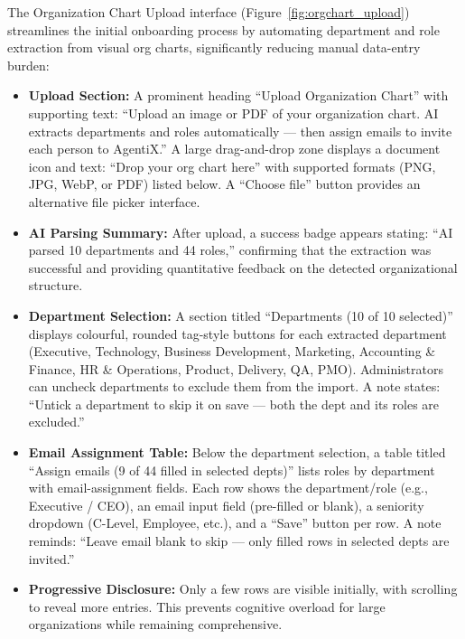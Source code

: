 \documentclass[12pt,oneside,openright,a4paper]{cpe-english-project}
\begin{document}
The Organization Chart Upload interface (Figure~\ref{fig:orgchart_upload}) streamlines the initial onboarding process by automating department and role extraction from visual org charts, significantly reducing manual data-entry burden:

\begin{itemize}
\item \textbf{Upload Section:} A prominent heading ``Upload Organization Chart'' with supporting text: ``Upload an image or PDF of your organization chart. AI extracts departments and roles automatically — then assign emails to invite each person to AgentiX.'' A large drag-and-drop zone displays a document icon and text: ``Drop your org chart here'' with supported formats (PNG, JPG, WebP, or PDF) listed below. A ``Choose file'' button provides an alternative file picker interface.

\item \textbf{AI Parsing Summary:} After upload, a success badge appears stating: ``AI parsed 10 departments and 44 roles,'' confirming that the extraction was successful and providing quantitative feedback on the detected organizational structure.

\item \textbf{Department Selection:} A section titled ``Departments (10 of 10 selected)'' displays colourful, rounded tag-style buttons for each extracted department (Executive, Technology, Business Development, Marketing, Accounting \& Finance, HR \& Operations, Product, Delivery, QA, PMO). Administrators can uncheck departments to exclude them from the import. A note states: ``Untick a department to skip it on save — both the dept and its roles are excluded.''

\item \textbf{Email Assignment Table:} Below the department selection, a table titled ``Assign emails (9 of 44 filled in selected depts)'' lists roles by department with email-assignment fields. Each row shows the department/role (e.g., Executive / CEO), an email input field (pre-filled or blank), a seniority dropdown (C-Level, Employee, etc.), and a ``Save'' button per row. A note reminds: ``Leave email blank to skip — only filled rows in selected depts are invited.''

\item \textbf{Progressive Disclosure:} Only a few rows are visible initially, with scrolling to reveal more entries. This prevents cognitive overload for large organizations while remaining comprehensive.
\end{itemize}
\end{document}
